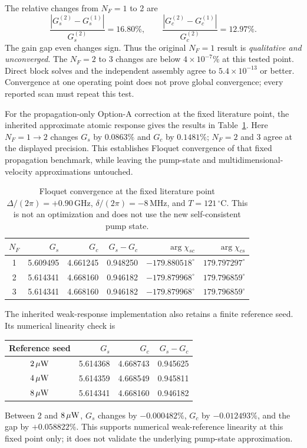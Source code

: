 \documentclass[11pt,a4paper]{article}
\newcommand{\GHz}{\,\mathrm{GHz}}
\newcommand{\MHz}{\,\mathrm{MHz}}
\newcommand{\degC}{\,^{\circ}\mathrm C}
\begin{document}
The relative changes from $N_F=1$ to 2 are
\[
\frac{|G_s^{(2)}-G_s^{(1)}|}{G_s^{(2)}}=16.80\%,
\qquad
\frac{|G_c^{(2)}-G_c^{(1)}|}{G_c^{(2)}}=12.97\%.
\]
The gain gap even changes sign. Thus the original $N_F=1$ result is
\emph{qualitative and unconverged}. The $N_F=2$ to 3 changes are below
$4\times10^{-7}\%$ at this tested point. Direct block solves and the
independent assembly agree to $5.4\times10^{-13}$ or better. Convergence at
one operating point does not prove global convergence; every reported scan
must repeat this test.

For the propagation-only Option-A correction at the fixed literature point,
the inherited approximate atomic response gives the results in
Table~\ref{tab:floquet-option-a}. Here $N_F=1\to2$ changes $G_s$ by
$0.0863\%$ and $G_c$ by $0.1481\%$; $N_F=2$ and 3 agree at the displayed
precision. This establishes Floquet convergence of that fixed propagation
benchmark, while leaving the pump-state and multidimensional-velocity
approximations untouched.
\begin{table}[ht]
\centering
\caption{Floquet convergence at the fixed literature point
$\Delta/(2\pi)=+0.90\GHz$, $\delta/(2\pi)=-8\MHz$, and $T=121\degC$.
This is not an optimization and does not use the new self-consistent pump
state.}
\label{tab:floquet-option-a}
\small
\begin{tabular}{c r r r r r}
\toprule
$N_F$ & $G_s$ & $G_c$ & $G_s-G_c$ &
$\arg\chi_{sc}$ & $\arg\chi_{cs}$\\
\midrule
1 & 5.609495 & 4.661245 & 0.948250 &
$-179.880518^\circ$ & $179.797297^\circ$\\
2 & 5.614341 & 4.668160 & 0.946182 &
$-179.879968^\circ$ & $179.796859^\circ$\\
3 & 5.614341 & 4.668160 & 0.946182 &
$-179.879968^\circ$ & $179.796859^\circ$\\
\bottomrule
\end{tabular}
\end{table}

The inherited weak-response implementation also retains a finite reference
seed. Its numerical linearity check is
\begin{center}
\begin{tabular}{c r r r}
\toprule
Reference seed & $G_s$ & $G_c$ & $G_s-G_c$\\
\midrule
$2\,\mu{\rm W}$ & 5.614368 & 4.668743 & 0.945625\\
$4\,\mu{\rm W}$ & 5.614359 & 4.668549 & 0.945811\\
$8\,\mu{\rm W}$ & 5.614341 & 4.668160 & 0.946182\\
\bottomrule
\end{tabular}
\end{center}
Between 2 and $8\,\mu{\rm W}$, $G_s$ changes by $-0.000482\%$, $G_c$ by
$-0.012493\%$, and the gap by $+0.058822\%$. This supports numerical
weak-reference linearity at this fixed point only; it does not validate the
underlying pump-state approximation.
\end{document}
